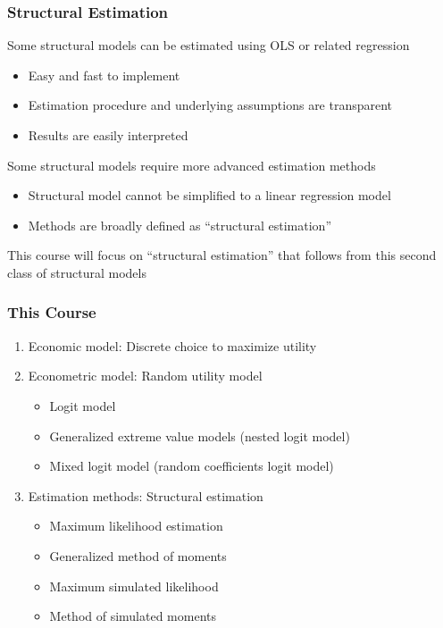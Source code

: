 \documentclass{beamer}
\begin{document}
\begin{frame}\frametitle{Structural Estimation}
    Some structural models can be estimated using OLS or related regression
    \begin{itemize}
        \item Easy and fast to implement
        \item Estimation procedure and underlying assumptions are transparent
        \item Results are easily interpreted
    \end{itemize}
    \vspace{3ex}
    Some structural models require more advanced estimation methods
    \begin{itemize}
        \item Structural model cannot be simplified to a linear regression model
        \item Methods are broadly defined as ``structural estimation''
    \end{itemize}
    \vspace{3ex}
    This course will focus on ``structural estimation'' that follows from this second class of structural models
\end{frame}

\begin{frame}\frametitle{This Course}
    \begin{enumerate}
    	\item Economic model: Discrete choice to maximize utility
    	\vspace{2ex}
    	\item Econometric model: Random utility model
    	\begin{itemize}
    		\item Logit model
    		\item Generalized extreme value models (nested logit model)
    		\item Mixed logit model (random coefficients logit model)
    	\end{itemize}
    	\vspace{2ex}
    	\item Estimation methods: Structural estimation
    	\begin{itemize}
    		\item Maximum likelihood estimation
    		\item Generalized method of moments
    		\item Maximum simulated likelihood
    		\item Method of simulated moments
    	\end{itemize}
    \end{enumerate}
\end{frame}
\end{document}
